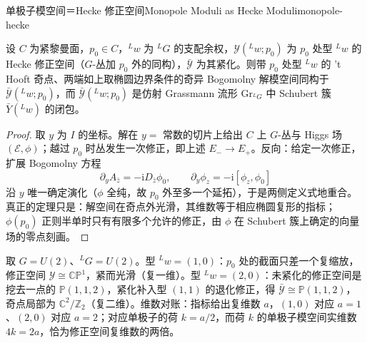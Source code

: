 \begin{centry}{单极子模空间＝Hecke 修正空间}{Monopole Moduli as Hecke Moduli}{monopole-hecke}
\begin{proposition}
设 $C$ 为紧黎曼面，$p_0\in C$，${}^{L}w$ 为 ${}^{L}G$ 的支配余权，$\mathcal{Y}({}^{L}w;p_0)$ 为 $p_0$ 处型 ${}^{L}w$ 的 Hecke 修正空间（$G$-丛加 $p_0$ 外的同构），$\bar{\mathcal{Y}}$ 为其紧化。则带 $p_0$ 处型 ${}^{L}w$ 的 't Hooft 奇点、两端如上取椭圆边界条件的奇异 Bogomolny 解模空间同构于 $\bar{\mathcal{Y}}({}^{L}w;p_0)$，而 $\bar{\mathcal{Y}}({}^{L}w;p_0)$ 是仿射 Grassmann 流形 $\mathrm{Gr}_{{}^{L}G}$ 中 Schubert 簇 $\bar{Y}({}^{L}w)$ 的闭包。
\end{proposition}
\begin{proof}
取 $y$ 为 $I$ 的坐标。解在 $y=$ 常数的切片上给出 $C$ 上 $G$-丛与 Higgs 场 $(\mathcal{E},\phi)$；越过 $p_0$ 时丛发生一次修正，即上述 $E_{-}\to E_{+}$。反向：给定一次修正，扩展 Bogomolny 方程
\[
\partial_yA_{\bar z}=-\mathrm{i}D_{\bar z}\phi_0,\qquad \partial_y\phi_z=-\mathrm{i}[\phi_z,\phi_0]
\]
沿 $y$ 唯一确定演化（$\phi$ 全纯，故 $p_0$ 外至多一个延拓），于是两侧定义式地重合。真正的定理只是：解空间在奇点外光滑，其维数等于相应椭圆复形的指标；$\phi(p_0)$ 正则半单时只有有限多个允许的修正，由 $\phi$ 在 Schubert 簇上确定的向量场的零点刻画。
\end{proof}


\begin{example}[$G=U(2)$：$(1,0)$ 与 $(2,0)$]
取 $G=U(2)$、${}^{L}G=U(2)$。型 ${}^{L}w=(1,0)$：$p_0$ 处的截面只差一个复缩放，修正空间 $\mathcal{Y}\cong\mathbb{CP}^{1}$，紧而光滑（复一维）。型 ${}^{L}w=(2,0)$：未紧化的修正空间是挖去一点的 $\mathbb{P}(1,1,2)$，紧化补入型 $(1,1)$ 的退化修正，得 $\bar{\mathcal{Y}}\cong\mathbb{P}(1,1,2)$，奇点局部为 $\mathbb{C}^{2}/\mathbb{Z}_2$（复二维）。维数对账：指标给出复维数 $a$，$(1,0)$ 对应 $a=1$、$(2,0)$ 对应 $a=2$；对应单极子的荷 $k=a/2$，而荷 $k$ 的单极子模空间实维数 $4k=2a$，恰为修正空间复维数的两倍。
\end{example}



\end{centry}
